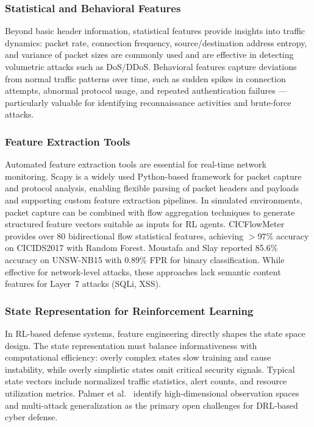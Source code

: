 \documentclass[conference]{IEEEtran}
\begin{document}
\subsubsection{Statistical and Behavioral Features}
Beyond basic header information, statistical features provide insights
into traffic dynamics: packet rate, connection frequency, source/destination
address entropy, and variance of packet sizes are commonly used and are
effective in detecting volumetric attacks such as DoS/DDoS. Behavioral
features capture deviations from normal traffic patterns over time, such
as sudden spikes in connection attempts, abnormal protocol usage, and
repeated authentication failures --- particularly valuable for identifying
reconnaissance activities and brute-force attacks.

\subsubsection{Feature Extraction Tools}
Automated feature extraction tools are essential for real-time network
monitoring. Scapy \cite{biondi2022scapy} is a widely used Python-based
framework for packet capture and protocol analysis, enabling flexible
parsing of packet headers and payloads and supporting custom feature
extraction pipelines. In simulated environments, packet capture can be
combined with flow aggregation techniques to generate structured feature
vectors suitable as inputs for RL agents.
CICFlowMeter \cite{sharafaldin2018cicids} provides over 80 bidirectional
flow statistical features, achieving ${>}97\%$ accuracy on CICIDS2017 with
Random Forest. Moustafa and Slay \cite{moustafa2015unswnb15} reported
85.6\% accuracy on UNSW-NB15 with 0.89\% FPR for binary classification.
While effective for network-level attacks, these approaches lack semantic
content features for Layer~7 attacks (SQLi, XSS).

\subsubsection{State Representation for Reinforcement Learning}
In RL-based defense systems, feature engineering directly shapes the state
space design. The state representation must balance informativeness with
computational efficiency: overly complex states slow training and cause
instability, while overly simplistic states omit critical security signals.
Typical state vectors include normalized traffic statistics, alert counts,
and resource utilization metrics. Palmer et al.\ \cite{palmer2023drlsurvey}
identify high-dimensional observation spaces and multi-attack generalization
as the primary open challenges for DRL-based cyber defense.
\end{document}
